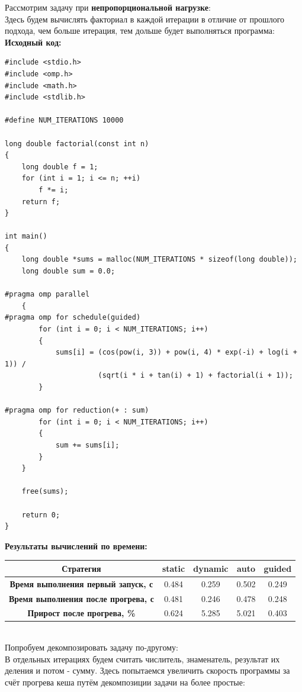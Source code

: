 \documentclass[a4paper,14pt]{extarticle}
\begin{document}
Рассмотрим задачу при \textbf{непропорциональной нагрузке}:\\

Здесь будем вычислять факториал в каждой итерации в отличие от прошлого подхода, чем больше
итерация, тем дольше будет выполняться программа:\\


\textbf{Исходный код:}
\begin{verbatim}
#include <stdio.h>
#include <omp.h>
#include <math.h>
#include <stdlib.h>

#define NUM_ITERATIONS 10000

long double factorial(const int n)
{
    long double f = 1;
    for (int i = 1; i <= n; ++i)
        f *= i;
    return f;
}

int main()
{
    long double *sums = malloc(NUM_ITERATIONS * sizeof(long double));
    long double sum = 0.0;

#pragma omp parallel
    {
#pragma omp for schedule(guided)
        for (int i = 0; i < NUM_ITERATIONS; i++)
        {
            sums[i] = (cos(pow(i, 3)) + pow(i, 4) * exp(-i) + log(i + 1)) /
                      (sqrt(i * i + tan(i) + 1) + factorial(i + 1));
        }

#pragma omp for reduction(+ : sum)
        for (int i = 0; i < NUM_ITERATIONS; i++)
        {
            sum += sums[i];
        }
    }

    free(sums);

    return 0;
}
\end{verbatim}

\textbf{Результаты вычислений по времени:}\\
\begin{tabular}{|c|c|c|c|c|}
    \hline
    \textbf{Стратегия}                          & static & dynamic & auto  & guided \\ 
    \hline
    \textbf{Время выполнения первый запуск, с}  & 0.484  & 0.259   & 0.502 & 0.249 \\
    \hline
    \textbf{Время выполнения после прогрева, с} & 0.481  & 0.246   & 0.478 & 0.248 \\
    \hline
    \textbf{Прирост после прогрева, \%}         & 0.624  & 5.285   & 5.021 & 0.403 \\
    \hline
\end{tabular}\\

Попробуем декомпозировать задачу по-другому:\\

В отдельных итерациях будем считать числитель, знаменатель, результат их
деления и потом - сумму. Здесь попытаемся увеличить скорость программы за счёт
прогрева кеша путём декомпозиции задачи на более простые:
\end{document}
